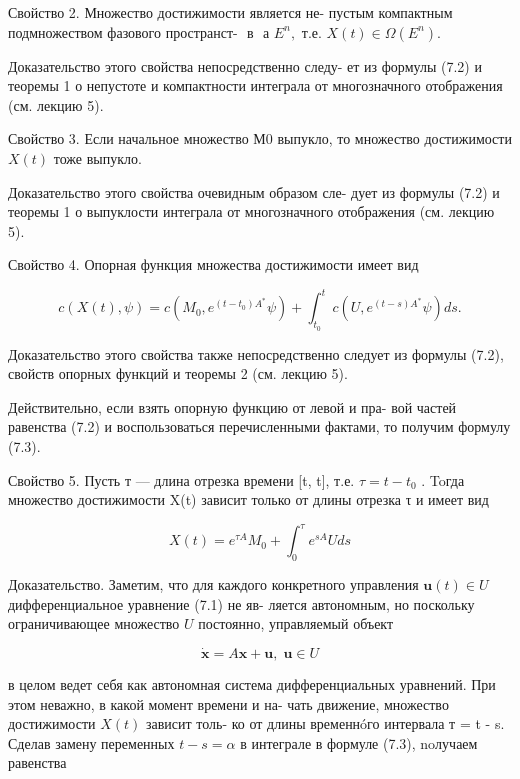 \documentclass[8pt]{extarticle}
\begin{document}
Свойство 2. Множество достижимости является не- пустым компактным подмножеством фазового пространст- \({\text{ в }\text{ а }}{E}^{n},\) т.е. \(X\left( t\right)  \in  \Omega \left( {E}^{n}\right) .\)

Доказательство этого свойства непосредственно следу- ет из формулы (7.2) и теоремы 1 о непустоте и компактности интеграла от многозначного отображения (см. лекцию 5).

Свойство 3. Если начальное множество М0 выпукло, то множество достижимости \(X\left( t\right)\) тоже выпукло.

Доказательство этого свойства очевидным образом сле- дует из формулы (7.2) и теоремы 1 о выпуклости интеграла от многозначного отображения (см. лекцию 5).

Свойство 4. Опорная функция множества достижимости имеет вид

\[
c\left( {X\left( t\right) ,\psi }\right)  = c\left( {{M}_{0},{e}^{\left( {t - {t}_{0}}\right) {A}^{ * }}\psi }\right)  + {\int }_{{t}_{0}}^{t}c\left( {U,{e}^{\left( {t - s}\right) {A}^{ * }}\psi }\right) {ds}. \tag{7.3}
\]

Доказательство этого свойства также непосредственно следует из формулы (7.2), свойств опорных функций и теоремы 2 (см. лекцию 5).

Действительно, если взять опорную функцию от левой и пра- вой частей равенства (7.2) и воспользоваться перечисленными фактами, то получим формулу (7.3).

Свойство 5. Пусть т — длина отрезка времени [t, t], т.е. \(\tau  = t - {t}_{0}\) . Toгда множество достижимости X(t) зависит только от длины отрезка τ и имеет вид

\[
X\left( t\right)  = {e}^{\tau A}{M}_{0} + {\int }_{0}^{\tau }{e}^{sA}{Uds} \tag{7.4}
\]

Доказательство. Заметим, что для каждого конкретного управления \(\mathbf{u}\left( t\right)  \in  U\) дифференциальное уравнение (7.1) не яв- ляется автономным, но поскольку ограничивающее множество \(U\) постоянно, управляемый объект

\[
\dot{\mathbf{x}} = A\mathbf{x} + \mathbf{u},\;\mathbf{u} \in  U
\]

в целом ведет себя как автономная система дифференциальных уравнений. При этом неважно, в какой момент времени и на- чать движение, множество достижимости \(X\left( t\right)\) зависит толь- ко от длины временнóго интервала т = t - s. Сделав замену переменных \(t - s = \alpha\) в интеграле в формуле (7.3), noлучаем равенства
\end{document}
